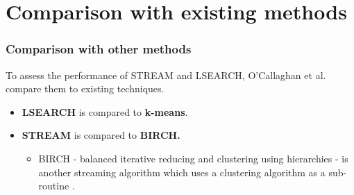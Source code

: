 \documentclass{beamer}
\begin{document}
\section{Comparison with existing methods}
\frame
{
  \frametitle{Comparison with other methods}
  To assess the performance of STREAM and LSEARCH, O'Callaghan et al. compare them to existing techniques.
  
  \bigskip 
  \begin{itemize}
  \item{\textbf{LSEARCH} is compared to \textbf{k-means}.}
  
  \bigskip
  \item{\textbf{STREAM} is compared to \textbf{BIRCH.}
    \begin{itemize}
      \item{BIRCH - balanced iterative reducing and clustering using hierarchies - is another streaming algorithm which uses a clustering algorithm as a sub-routine \cite{1996birch}.}
    \end{itemize}
  }
  	     
  \end{itemize}
}
\end{document}
